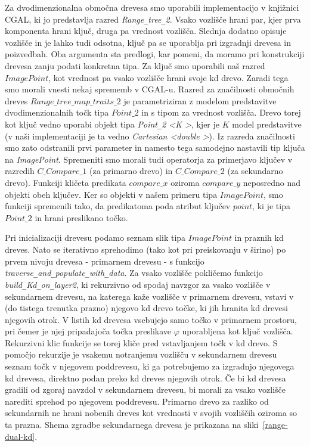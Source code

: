 \documentclass[a4paper, 12pt]{book}
\newcommand{\U}{\texttt{\_}}
\begin{document}
Za dvodimenzionalna območna drevesa smo uporabili implementacijo v knjiž\-ni\-ci CGAL, ki jo predstavlja razred \textit{Range\texttt{\_}tree\texttt{\_}2}. Vsako vozlišče hrani par, kjer prva komponenta hrani ključ, druga pa vrednost vozlišča. Slednja dodatno opisuje vozlišče in je lahko tudi odsotna, ključ pa se uporablja pri izgradnji drevesa in poizvedbah. Oba argumenta sta predlogi, kar pomeni, da moramo pri konstrukciji drevesa zanju podati konkretna tipa. 
Za ključ smo uporabili naš razred $ImagePoint$, kot vrednost pa vsako vozlišče hrani svoje kd drevo. Zaradi tega smo morali vnesti nekaj sprememb v CGAL-u. Razred za značilnosti območnih dreves $Range\U tree\U map\U traits\U 2$ je parametriziran z modelom predstavitve dvodimenzionalnih točk tipa $Point\U 2$ in s tipom za vrednost vozlišča. Drevo torej kot ključ vedno uporabi objekt tipa \textit{Point\U 2 \textless K \textgreater}, kjer je $K$ model predstavitve (v naši implementaciji je ta vedno \textit{Cartesian \textless double \textgreater}). Iz razreda značilnosti smo zato odstranili prvi parameter in namesto tega samodejno nastavili tip ključa na \textit{ImagePoint}. Spremeniti smo morali tudi operatorja za primerjavo ključev v razredih $C\U Compare\U 1$ (za primarno drevo) in $C\U Compare\U 2$ (za sekundarno drevo). Funkciji kličeta predikata $compare\U x$ oziroma $compare\U y$ neposredno nad objekti obeh ključev. Ker so objekti v našem primeru tipa $ImagePoint$, smo funkciji spremenili tako, da predikatoma poda atribut ključev $point$, ki je tipa $Point\U 2$ in hrani preslikano točko.

Pri inicializaciji drevesu podamo seznam slik tipa $ImagePoint$ in praznih kd dreves. Nato se iterativno sprehodimo (tako kot pri preiskovanju v širino) po prvem nivoju drevesa - primarnem drevesu - s funkcijo \textit{traverse\U and\U popu\-la\-te\U with\U data}. Za vsako vozlišče pokličemo funkcijo \textit{build\U Kd\U on\U la\-yer2}, ki rekurzivno  od spodaj navzgor za vsako vozlišče v sekundarnem drevesu, na katerega kaže vozlišče v primarnem drevesu, vstavi v (do tistega trenutka prazno) njegovo kd drevo točke, ki jih hranita kd drevesi njegovih otrok. V listih kd drevesa vsebujejo samo točko v primarnem prostoru, pri čemer je njej pripadajoča točka preslikave $\varphi$ uporabljena kot ključ vozlišča. Rekurzivni klic funkcije se torej kliče pred vstavljanjem točk v kd drevo. S pomočjo rekurzije je vsakemu notranjemu vozlišču v sekundarnem drevesu seznam točk v njegovem poddrevesu, ki ga potrebujemo za izgradnjo njegovega kd drevesa, direktno podan preko kd dreves njegovih otrok. Če bi kd drevesa gradili od zgoraj navzdol v sekundarnem drevesu, bi morali za vsako vozlišče narediti sprehod po njegovem poddrevesu. Primarno drevo za razliko od sekundarnih ne hrani nobenih dreves kot vrednosti v svojih vozliščih oziroma so ta prazna. Shema zgradbe sekundarnega drevesa je prikazana na sliki~\ref{range-dual-kd}.
\end{document}
